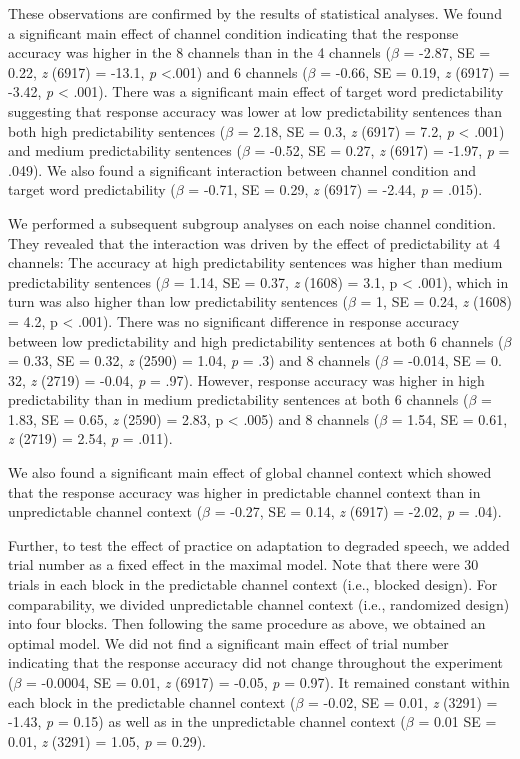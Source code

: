 \documentclass[a4paper, nobind]{templates/ociamthesis}
\begin{document}
These observations are confirmed by the results of statistical analyses.
We found a significant main effect of channel condition indicating that the response accuracy was higher in the 8 channels than in the 4 channels (\(\beta\) = -2.87, SE = 0.22, \emph{z} (6917) = -13.1, \emph{p} \textless.001) and 6 channels (\(\beta\) = -0.66, SE = 0.19, \emph{z} (6917) = -3.42, \emph{p} \textless{} .001).
There was a significant main effect of target word predictability suggesting that response accuracy was lower at low predictability sentences than both high predictability sentences (\(\beta\) = 2.18, SE = 0.3, \emph{z} (6917) = 7.2, \emph{p} \textless{} .001) and medium predictability sentences (\(\beta\) = -0.52, SE = 0.27, \emph{z} (6917) = -1.97, \emph{p} = .049).
We also found a significant interaction between channel condition and target word predictability (\(\beta\) = -0.71, SE = 0.29, \emph{z} (6917) = -2.44, \emph{p} = .015).

We performed a subsequent subgroup analyses on each noise channel condition.
They revealed that the interaction was driven by the effect of predictability at 4 channels:
The accuracy at high predictability sentences was higher than medium predictability sentences (\(\beta\) = 1.14, SE = 0.37, \emph{z} (1608) = 3.1, p \textless{} .001),
which in turn was also higher than low predictability sentences (\(\beta\) = 1, SE = 0.24, \emph{z} (1608) = 4.2, p \textless{} .001).
There was no significant difference in response accuracy between low predictability and high predictability sentences at both 6 channels (\(\beta\) = 0.33, SE = 0.32, \emph{z} (2590) = 1.04, \emph{p} = .3) and 8 channels (\(\beta\) = -0.014, SE = 0. 32, \emph{z} (2719) = -0.04, \emph{p} = .97).
However, response accuracy was higher in high predictability than in medium predictability sentences at both 6 channels (\(\beta\) = 1.83, SE = 0.65, \emph{z} (2590) = 2.83, p \textless{} .005) and 8 channels (\(\beta\) = 1.54, SE = 0.61, \emph{z} (2719) = 2.54, \emph{p} = .011).

We also found a significant main effect of global channel context which showed that the response accuracy was higher in predictable channel context than in unpredictable channel context (\(\beta\) = -0.27, SE = 0.14, \emph{z} (6917) = -2.02, \emph{p} = .04).

Further, to test the effect of practice on adaptation to degraded speech, we added trial number as a fixed effect in the maximal model.
Note that there were 30 trials in each block in the predictable channel context (i.e., blocked design).
For comparability, we divided unpredictable channel context (i.e., randomized design) into four blocks.
Then following the same procedure as above, we obtained an optimal model.
We did not find a significant main effect of trial number indicating that the response accuracy did not change throughout the experiment (\(\beta\) = -0.0004, SE = 0.01, \emph{z} (6917) = -0.05, \emph{p} = 0.97).
It remained constant within each block in the predictable channel context (\(\beta\) = -0.02, SE = 0.01, \emph{z} (3291) = -1.43, \emph{p} = 0.15) as well as in the unpredictable channel context (\(\beta\) = 0.01 SE = 0.01, \emph{z} (3291) = 1.05, \emph{p} = 0.29).
\end{document}
